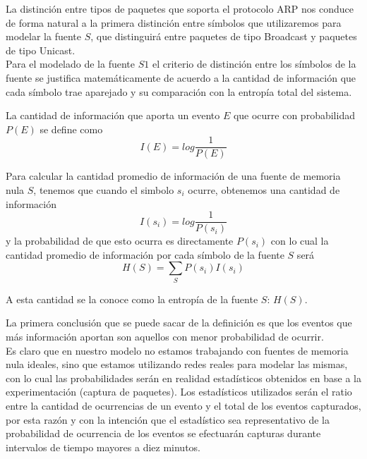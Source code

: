 La distinción entre tipos de paquetes que soporta el protocolo ARP nos conduce de forma natural a la primera distinción entre símbolos que utilizaremos para modelar la fuente $S$, que distinguirá entre paquetes de tipo Broadcast y paquetes de tipo Unicast.\\

Para el modelado de la fuente $S1$ el criterio de distinción entre los símbolos de la fuente se justifica  matemáticamente de acuerdo a la cantidad de información que cada símbolo trae aparejado y su comparación con la entropía total del sistema.

La cantidad de información que aporta un evento $E$ que ocurre con probabilidad $P(E)$ se define como 
\[I(E) = log \frac{1}{P(E)}\]

Para calcular la cantidad promedio de información de una fuente de memoria nula $S$, tenemos que cuando el simbolo $s_i$ ocurre, obtenemos una cantidad de información 
\[I(s_i) = log \frac{1}{P(s_i)}\]
y la probabilidad de que esto ocurra es directamente $P(s_i)$ con lo cual la cantidad promedio de información por cada símbolo de la fuente $S$ será
\[H(S) = \sum_{S} P(s_i) I(s_i)\]

A esta cantidad se la conoce como la entropía de la fuente $S$: $H(S)$.

La primera conclusión que se puede sacar de la definición es que los eventos que más información aportan son aquellos con menor probabilidad de ocurrir.\\

Es claro que en nuestro modelo no estamos trabajando con fuentes de memoria nula ideales, sino que estamos utilizando redes reales para modelar las mismas, con lo cual las probabilidades serán en realidad estadísticos obtenidos en base a la experimentación (captura de paquetes). Los estadísticos utilizados serán el ratio entre la cantidad de ocurrencias de un evento y el total de los eventos capturados, por esta razón y con la intención que el estadístico sea representativo de la probabilidad de ocurrencia de los eventos se efectuarán capturas durante intervalos de tiempo mayores a diez minutos.

